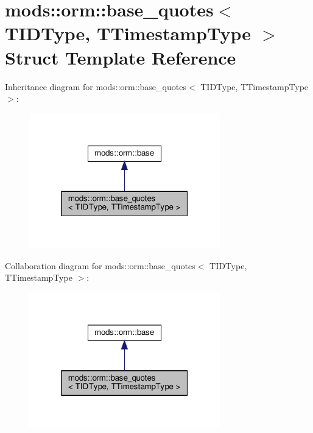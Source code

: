 \hypertarget{structmods_1_1orm_1_1base__quotes}{}\section{mods\+:\+:orm\+:\+:base\+\_\+quotes$<$ T\+I\+D\+Type, T\+Timestamp\+Type $>$ Struct Template Reference}
\label{structmods_1_1orm_1_1base__quotes}


Inheritance diagram for mods\+:\+:orm\+:\+:base\+\_\+quotes$<$ T\+I\+D\+Type, T\+Timestamp\+Type $>$\+:\nopagebreak
\begin{figure}[H]
\begin{center}
\leavevmode
\includegraphics[width=235pt]{structmods_1_1orm_1_1base__quotes__inherit__graph}
\end{center}
\end{figure}


Collaboration diagram for mods\+:\+:orm\+:\+:base\+\_\+quotes$<$ T\+I\+D\+Type, T\+Timestamp\+Type $>$\+:\nopagebreak
\begin{figure}[H]
\begin{center}
\leavevmode
\includegraphics[width=235pt]{structmods_1_1orm_1_1base__quotes__coll__graph}
\end{center}
\end{figure}
